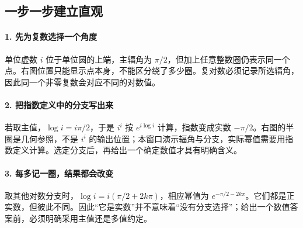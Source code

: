 \subsection*{一步一步建立直观}

\paragraph{1. 先为复数选择一个角度}

单位虚数 $i$ 位于单位圆的上端，主辐角为 $\pi/2$，但加上任意整数圈仍表示同一个点。右图位置只能显示点本身，不能区分绕了多少圈。复对数必须记录所选辐角，因此同一个非零复数会对应不同的对数值。



\paragraph{2. 把指数定义中的分支写出来}

若取主值，$\log i=i\pi/2$，于是 $i^i$ 按 $e^{i\log i}$ 计算，指数变成实数 $-\pi/2$。右图的半圈是几何参照，不是 $i^i$ 的输出位置；本窗口演示辐角与分支，实际幂值需要用指数定义计算。选定分支后，再给出一个确定数值才具有明确含义。



\paragraph{3. 每多记一圈，结果都会改变}

取其他对数分支时，$\log i=i(\pi/2+2k\pi)$，相应幂值为 $e^{-\pi/2-2k\pi}$。它们都是正实数，但彼此不同。因此“它是实数”并不意味着“没有分支选择”；给出一个数值答案前，必须明确采用主值还是多值约定。
